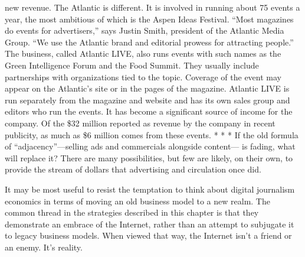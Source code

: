new revenue. The Atlantic is different. It is involved in running about 75 events
a year, the most ambitious of which is the Aspen Ideas Festival. ``Most magazines
do events for advertisers,'' says Justin Smith, president of the Atlantic Media
Group. ``We use the Atlantic brand and editorial prowess for attracting people.''
The business, called Atlantic LIVE, also runs events with such names as the Green
Intelligence Forum and the Food Summit. They usually include partnerships
with organizations tied to the topic. Coverage of the event may appear on the
Atlantic's site or in the pages of the magazine.
Atlantic LIVE is run separately from the magazine and website and has its own
sales group and editors who run the events. It has become a significant source of
income for the company. Of the \$32 million reported as revenue by the company
in recent publicity, as much as \$6 million comes from these events.
* * *
If the old formula of ``adjacency''—selling ads and commercials alongside content—
is fading, what will replace it? There are many possibilities, but few are
likely, on their own, to provide the stream of dollars that advertising and circulation
once did.

It may be most useful to resist the temptation to think about digital journalism
economics in terms of moving an old business model to a new realm. The
common thread in the strategies described in this chapter is that they demonstrate
an embrace of the Internet, rather than an attempt to subjugate it to
legacy business models.
When viewed that way, the Internet isn't a friend or an enemy. It's reality.



